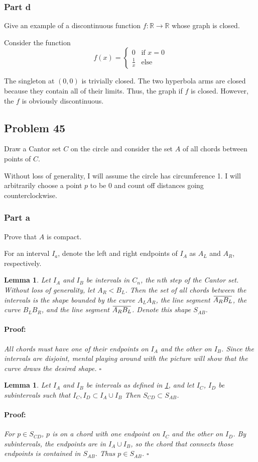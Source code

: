 \documentclass{article}
\newenvironment{proof}{\paragraph{Proof:}}{\hfill$\square$}
\newtheorem{lemma}[theorem]{Lemma}
\newcommand{\overbar}[1]{\mkern 1.5mu\overline{\mkern-1.5mu#1\mkern-1.5mu}\mkern 1.5mu}
\begin{document}
\subsubsection*{Part d}

Give an example of a discontinuous function $f: \mathbb{R} \rightarrow \mathbb{R}$ whose graph is closed.

Consider the function
\[
f(x) = 
\begin{cases}
0 & \text{if } x = 0 \\
\frac{1}{x} & \text{else}
\end{cases}
\]

The singleton at $(0, 0)$ is trivially closed. The two hyperbola arms are closed because they contain all of their limits. Thus, the graph if $f$ is closed. However, the $f$ is obviously discontinuous.

\subsection*{Problem 45}
Draw a Cantor set $C$ on the circle and consider the set $A$ of all chords between points of $C$.

Without loss of generality, I will assume the circle has circumference 1. I will arbitrarily choose a point $p$ to be $0$ and count off distances going counterclockwise.
\subsubsection*{Part a}
Prove that $A$ is compact.

For an interval $I_a$, denote the left and right endpoints of $I_A$ as $A_L$ and $A_R$, respectively.
\begin{lemma}
\label{TwoIntervalChords}
Let $I_A$ and $I_B$ be intervals in $C_n$, the $n$th step of the Cantor set. Without loss of generality, let $A_R < B_L$. Then the set of all chords between the intervals is the shape bounded by the curve $A_L A_R$, the line segment $\overbar{A_R B_L}$, the curve $B_L B_R$, and the line segment $\overbar{A_R B_L}$. Denote this shape $S_{AB}$.
\begin{proof}
All chords must have one of their endpoints on $I_A$ and the other on $I_B$. Since the intervals are disjoint, mental playing around with the picture will show that the curve draws the desired shape.
\end{proof}
\end{lemma}

\begin{lemma}
\label{SubintervalChords}
Let $I_A$ and $I_B$ be intervals as defined in \ref{TwoIntervalChords}, and let $I_C$, $I_D$ be subintervals such that $I_C, I_D \subset I_A \cup I_B$ Then $S_{CD} \subset S_{AB}$.
\begin{proof}
For $p \in S_{CD}$, $p$ is on a chord with one endpoint on $I_C$ and the other on $I_D$. By subintervals, the endpoints are in $I_A \cup I_B$, so the chord that connects those endpoints is contained in $S_{AB}$. Thus $p \in S_{AB}$.
\end{proof}
\end{lemma}
\end{document}
